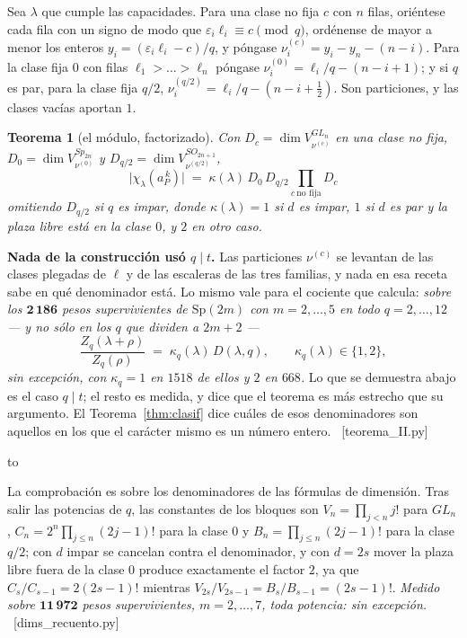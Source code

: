 \documentclass[11pt,a4paper]{article}
\newtheorem{theorem}{Teorema}[section]
\newcommand{\Sp}{\mathrm{Sp}}
\newcommand{\ver}[1]{\unskip\penalty0\ \textcolor{azul}{\small\textsf{[#1]}}}
\newenvironment{keybox}
  {\par\vspace{9pt}\begin{lrbox}{\fichabox}%
   \begin{minipage}{0.90\textwidth}\vspace{7pt}\setlength{\parskip}{3pt}}
  {\vspace{7pt}\end{minipage}\end{lrbox}%
   \par\noindent\hbox to \textwidth{\hfill
   \textcolor{azul}{\rule[-\dp\fichabox]{3.2pt}{\dimexpr\ht\fichabox+\dp\fichabox\relax}}%
   \colorbox{fondoficha}{\usebox{\fichabox}}\hfill}%
   \par\vspace{9pt}}
\begin{document}
Sea $\lambda$ que cumple las capacidades. Para una clase no fija $c$ con $n$ filas, oriéntese cada
fila con un signo de modo que $\varepsilon_i\ell_i\equiv c\pmod q$, ordénense de mayor a menor los
enteros $y_i=(\varepsilon_i\ell_i-c)/q$, y póngase $\nu^{(c)}_i=y_i-y_n-(n-i)$. Para la clase fija
$0$ con filas $\ell_1>\dots>\ell_n$ póngase $\nu^{(0)}_i=\ell_i/q-(n-i+1)$; y si $q$ es par, para la
clase fija $q/2$, $\nu^{(q/2)}_i=\ell_i/q-(n-i+\tfrac12)$. Son particiones, y las clases vacías
aportan $1$.

\begin{theorem}[el módulo, factorizado]\label{thm:dims}
Con $D_c=\dim V^{GL_n}_{\nu^{(c)}}$ en una clase no fija, $D_0=\dim V^{Sp_{2n}}_{\nu^{(0)}}$ y
$D_{q/2}=\dim V^{SO_{2n+1}}_{\nu^{(q/2)}}$,
\[
\boxed{\;
\bigl|\chi_\lambda(a_P^{\,k})\bigr|\;=\;\kappa(\lambda)\,D_0\,D_{q/2}
\prod_{c\ \text{no fija}} D_c \;}
\]
omitiendo $D_{q/2}$ si $q$ es impar, donde $\kappa(\lambda)=1$ si $d$ es impar, $1$ si $d$ es par y
la plaza libre está en la clase $0$, y $2$ en otro caso.
\end{theorem}

\begin{keybox}
\textbf{Nada de la construcción usó $q\mid t$.} Las particiones $\nu^{(c)}$ se levantan de las
clases plegadas de $\ell$ y de las escaleras de las tres familias, y nada en esa receta sabe en qué
denominador está. Lo mismo vale para el cociente que calcula: \emph{sobre los $\mathbf{2\,186}$
pesos supervivientes de $\Sp(2m)$ con $m=2,\dots,5$ en todo $q=2,\dots,12$ --- y no sólo en los $q$
que dividen a $2m+2$ ---}
\[
\frac{Z_q(\lambda+\rho)}{Z_q(\rho)}\;=\;\kappa_q(\lambda)\,D(\lambda,q),
\qquad \kappa_q(\lambda)\in\{1,2\},
\]
\emph{sin excepción, con $\kappa_q=1$ en $1518$ de ellos y $2$ en $668$.} Lo que se demuestra abajo
es el caso $q\mid t$; el resto es medida, y dice que el teorema es más estrecho que su argumento. El
Teorema~\ref{thm:clasif} dice cuáles de esos denominadores son aquellos en los que el carácter mismo
es un número entero. \ver{teorema\_II.py}
\end{keybox}

\noindent La comprobación es sobre los denominadores de las fórmulas de dimensión. Tras salir las
potencias de $q$, las constantes de los bloques son $V_n=\prod_{j<n}j!$ para $GL_n$,
$C_n=2^n\prod_{j\le n}(2j-1)!$ para la clase $0$ y $B_n=\prod_{j\le n}(2j-1)!$ para la clase $q/2$;
con $d$ impar se cancelan contra el denominador, y con $d=2s$ mover la plaza libre fuera de la clase
$0$ produce exactamente el factor $2$, ya que $C_s/C_{s-1}=2(2s-1)!$ mientras
$V_{2s}/V_{2s-1}=B_s/B_{s-1}=(2s-1)!$. \emph{Medido sobre $\mathbf{11\,972}$ pesos supervivientes,
$m=2,\dots,7$, toda potencia: sin excepción.} \ver{dims\_recuento.py}
\end{document}

